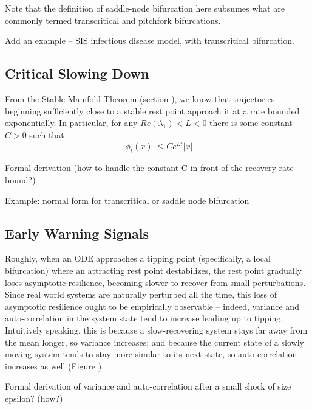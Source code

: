 Note that the definition of saddle-node bifurcation here subsumes what are commonly termed transcritical and pitchfork bifurcations. 

Add an example -- SIS infectious disease model, with transcritical bifurcation. 

%


\subsection{Critical Slowing Down}

From the Stable Manifold Theorem (section ), we know that trajectories beginning sufficiently close to a stable rest point approach it at a rate bounded exponentially. In particular, for any $Re(\lambda_1) < L < 0$ there is some constant $C >0$ such that
$$|\phi_t(x)| \leq Ce^{Lt}|x|$$


Formal derivation (how to handle the constant C in front of the recovery rate bound?)

Example: normal form for transcritical or saddle node bifurcation

\subsection{Early Warning Signals}

Roughly, when an ODE approaches a tipping point (specifically, a local bifurcation) where an attracting rest point destabilizes, the rest point gradually loses asymptotic resilience, becoming slower to recover from small perturbations. Since real world systems are naturally perturbed all the time, this loss of asymptotic resilience ought to be empirically observable -- indeed, variance and auto-correlation in the system state tend to increase leading up to tipping. Intuitively speaking, this is because a slow-recovering system stays far away from the mean longer, so variance increases; and because the current state of a slowly moving system tends to stay more similar to its next state, so auto-correlation increases as well (Figure ).


Formal derivation of variance and auto-correlation after a small shock of size epsilon? (how?)

	
